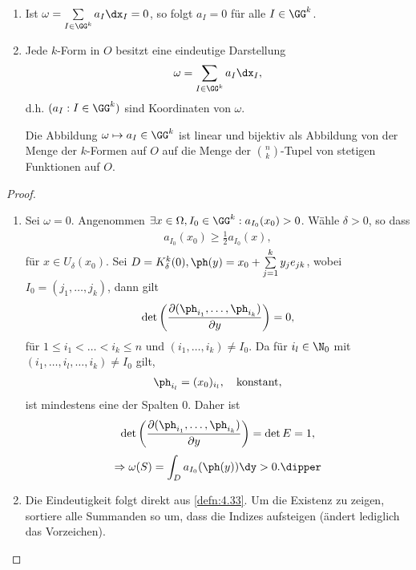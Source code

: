 \begin{prop}
\label{prop:4.34}
\begin{enumerate}[label=\arabic{*}.)]
  \item Ist $\omega = \sum\limits_{I\in\GG^{k}} a_I \dx_I = 0$, so folgt $a_I =
  0$ für alle $I\in \GG^k$.
  \item Jede $k$-Form in $O$ besitzt eine eindeutige Darstellung
  \begin{align*}
  \omega =
  \sum\limits_{I\in\GG^{k}} a_I\dx_I,
  \end{align*}
d.h. $(a_I : I\in \GG^k)$ sind Koordinaten von $\omega$.

Die Abbildung $\omega\mapsto a_I\in \GG^k$ ist linear und bijektiv als
Abbildung von der Menge der $k$-Formen auf $O$ auf die Menge der
$\binom{n}{k}$-Tupel von stetigen Funktionen auf $O$.\fishhere
\end{enumerate}
\end{prop}
\begin{proof}
\begin{enumerate}[label=\arabic{*}.)]
\item Sei $\omega = 0$. Angenommen $\exists x\in \Omega, I_0\in\GG^k :
a_{I_0}(x_0) > 0$. Wähle $\delta > 0$, so dass
\begin{align*}
a_{I_0}(x_0) \ge \frac{1}{2} a_{I_0}(x),
\end{align*}
für $x\in U_\delta(x_0)$. Sei $D=K_\delta^k(0), \ph(y) = x_0 +
\sum\limits_{j=1}^k y_j e_{jk}$,
wobei $I_0 = (j_1,\ldots,j_k)$, dann gilt
\begin{align*}
\det\left(\frac{\partial(\ph_{i_1},\ldots,\ph_{i_k})}{\partial y} \right) = 0,
\end{align*}
für $1\le i_1 < \ldots < i_k\le n$ und $(i_1,\ldots,i_k)\neq I_0$. Da für
$i_l\in\N_0$ mit $(i_1, \ldots, i_l, \ldots, i_k)\neq I_0$ gilt,
\begin{align*}
\ph_{i_l} = (x_0)_{i_l},\quad\text{konstant},
\end{align*}
ist mindestens eine der Spalten $0$. Daher ist
\begin{align*}
\det\left(\frac{\partial(\ph_{i_1},\ldots,\ph_{i_k})}{\partial y} \right) =
\det E = 1,
\end{align*}
\begin{align*}
\Rightarrow \omega(S) = \int_D a_{I_0}(\ph(y))\dy > 0.\dipper
\end{align*} 
\item Die Eindeutigkeit folgt direkt aus \ref{defn:4.33}. Um die Existenz zu
zeigen, sortiere alle Summanden so um, dass die Indizes aufsteigen  (ändert
lediglich das Vorzeichen).\qedhere
\end{enumerate}
\end{proof}

